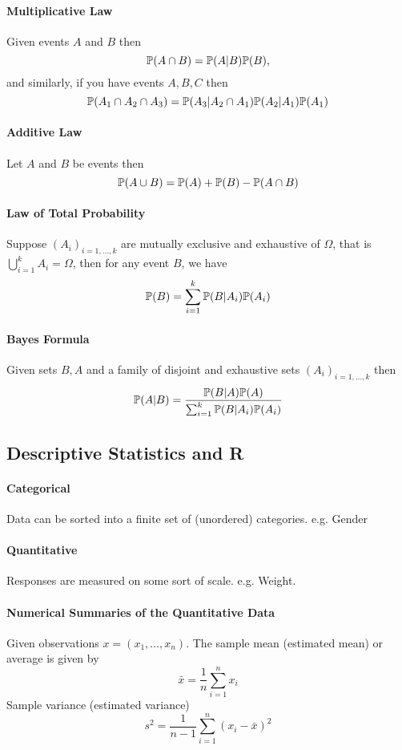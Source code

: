 \paragraph{Multiplicative Law}
Given events \(A\) and \(B\) then
\[\mathbb{P}(A \cap B) = \mathbb{P}(A|B)\mathbb{P}(B),\]
and similarly, if you have events \(A, B, C\) then
\[\mathbb{P}(A_1 \cap A_2 \cap A_3) = \mathbb{P}(A_3 | A_2 \cap A_1)\mathbb{P}(A_2|A_1)\mathbb{P}(A_1)\]

\paragraph{Additive Law}
Let \(A\) and \(B\) be events then
\[\mathbb{P}(A \cup B) = \mathbb{P}(A) + \mathbb{P}(B) - \mathbb{P}(A \cap B)\]

\paragraph{Law of Total Probability}
Suppose \((A_i)_{i=1,\dots,k}\) are mutually exclusive and exhaustive of \(\Omega\), that is \(\bigcup_{i=1}^k A_i = \Omega\), then for any event \(B\), we have 
\[\mathbb{P}(B) = \sum_{i=1}^k \mathbb{P}(B|A_i)\mathbb{P}(A_i)\]

\paragraph{Bayes Formula}
Given sets \(B, A\) and a family of disjoint and exhaustive sets \((A_i)_{i=1,\dots,k}\) then
\[\mathbb{P}(A|B) = \frac{\mathbb{P}(B|A)\mathbb{P}(A)}{\sum_{i=1}^k \mathbb{P}(B|A_i)\mathbb{P}(A_i)}\]

\subsection{Descriptive Statistics and R}
\paragraph{Categorical}
Data can be sorted into a finite set of (unordered) categories. e.g. Gender

\paragraph{Quantitative}
Responses are measured on some sort of scale. e.g. Weight.

\paragraph{Numerical Summaries of the Quantitative Data}
Given observations \(x = (x_1, \dots, x_n)\). The sample mean (estimated mean) or average is given by 
\[\bar{x} = \frac{1}{n}\sum_{i=1}^n x_i\]
Sample variance (estimated variance)
\[s^2 = \frac{1}{n-1}\sum_{i=1}^n (x_i - \bar{x})^2\]